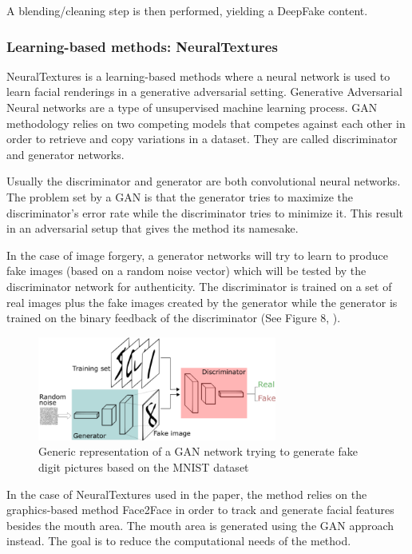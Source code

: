 \documentclass{article} %
\begin{document}
A blending/cleaning step is then performed, yielding a DeepFake content.

\subsubsection{Learning-based methods: NeuralTextures}

NeuralTextures is a learning-based methods where a neural network is used to learn facial renderings in a generative adversarial setting. Generative Adversarial Neural networks are a type of unsupervised machine learning process. GAN methodology relies on two competing models that competes against each other in order to retrieve and copy variations in a dataset. They are called discriminator and generator networks.

Usually the discriminator and generator are both convolutional neural networks. The problem set by a GAN is that the generator tries to maximize the discriminator's error rate while the discriminator tries to minimize it. This result in an adversarial setup that gives the method its namesake. 

In the case of image forgery, a generator networks will try to learn to produce fake images (based on a random noise vector) which will be tested by the discriminator network for authenticity. The discriminator is trained on a set of real images plus the fake images created by the generator while the generator is trained on the binary feedback of the discriminator (See Figure 8, \cite{silva}). 

\begin{figure}[H]
\begin{center}
\includegraphics[width=0.7\textwidth]{images/GAN.png}
\end{center}
\caption{Generic representation of a GAN network trying to generate fake digit pictures based on the MNIST dataset \citep{silva}}
\end{figure}

In the case of NeuralTextures used in the paper, the method relies on the graphics-based method Face2Face in order to track and generate facial features besides the mouth area. The mouth area is generated using the GAN approach instead. The goal is to reduce the computational needs of the method.
\end{document}
